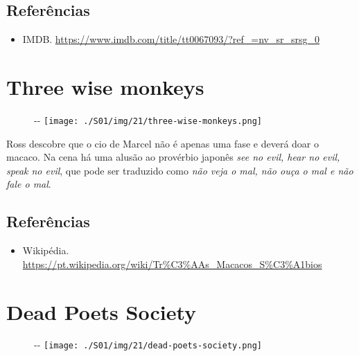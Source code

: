 \hypertarget{referuxeancias-1}{%
\subsection{Referências}\label{referuxeancias-1}}

\begin{itemize}
\tightlist
\item
  \sloppy IMDB. \url{https://www.imdb.com/title/tt0067093/?ref_=nv_sr_srsg_0}
\end{itemize}

\hypertarget{three-wise-monkeys}{%
\section{Three wise monkeys}\label{three-wise-monkeys}}

\begin{figure}[!ht]
  \begin{adjustwidth}{-\oddsidemargin-1in}{-\rightmargin}
    \centering
    \texttt{[image: ./S01/img/21/three-wise-monkeys.png]}
  \end{adjustwidth}
\end{figure}

Ross descobre que o cio de Marcel não é apenas uma fase e deverá doar o
macaco. Na cena há uma alusão ao provérbio japonês \emph{see no evil,
hear no evil, speak no evil}, que pode ser traduzido como \emph{não veja
o mal, não ouça o mal e não fale o mal}.

\hypertarget{referuxeancias-2}{%
\subsection{Referências}\label{referuxeancias-2}}

\begin{itemize}
\tightlist
\item
  \sloppy Wikipédia. \url{https://pt.wikipedia.org/wiki/Tr%C3%AAs_Macacos_S%C3%A1bios}
\end{itemize}

\hypertarget{dead-poets-society}{%
\section{Dead Poets Society}\label{dead-poets-society}}

\begin{figure}[!ht]
  \begin{adjustwidth}{-\oddsidemargin-1in}{-\rightmargin}
    \centering
    \texttt{[image: ./S01/img/21/dead-poets-society.png]}
  \end{adjustwidth}
\end{figure}

